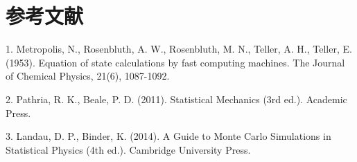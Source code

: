 \documentclass[supercite]{Experimental_Report}
\theoremstyle{definition}
\begin{document}
	\section{参考文献}
	1. Metropolis, N., Rosenbluth, A. W., Rosenbluth, M. N., Teller, A. H., Teller, E. (1953). Equation of state calculations by fast computing machines. The Journal of Chemical Physics, 21(6), 1087-1092.
	
	2. Pathria, R. K., Beale, P. D. (2011). Statistical Mechanics (3rd ed.). Academic Press.
	
	3. Landau, D. P., Binder, K. (2014). A Guide to Monte Carlo Simulations in Statistical Physics (4th ed.). Cambridge University Press.
	
	
	
	
	
	
\end{document}
